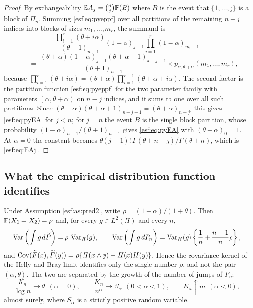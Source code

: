 \begin{proof}
By exchangeability $\mathbb{E} A_j = \binom{n}{j} \mathbb{P}(B)$ where $B$ is the event that
$\{1,\dots,j\}$ is a block of $\Pi_n$. Summing \eqref{esf:eq:pyeppf} over all partitions
of the remaining $n-j$ indices into blocks of sizes $m_1,\dots,m_r$, the summand is
\[
\frac{\prod_{i=1}^{r}(\theta+i\alpha)}{(\theta+1)_{n-1}} (1-\alpha)_{j-1}
\prod_{i=1}^{r} (1-\alpha)_{m_i - 1}
\]
\[
\qquad = \; \frac{(\theta+\alpha) (1-\alpha)_{j-1} (\theta+\alpha+1)_{n-j-1}}
{(\theta+1)_{n-1}} \times p_{\alpha, \theta+\alpha}(m_1,\dots,m_r),
\]
because $\prod_{i=1}^{r}(\theta+i\alpha) = (\theta+\alpha)
\prod_{i=1}^{r-1}(\theta+\alpha+i\alpha)$. The second factor is the partition function
\eqref{esf:eq:pyeppf} for the two parameter family with parameters $(\alpha, \theta+\alpha)$
on $n-j$ indices, and it sums to one over all such partitions. Since $(\theta+\alpha)(\theta+\alpha+1)_{n-j-1} = (\theta+\alpha)_{n-j}$, this gives \eqref{esf:eq:pyEA} for $j < n$; for $j = n$ the event $B$ is the single block partition, whose probability $(1-\alpha)_{n-1}/(\theta+1)_{n-1}$ gives \eqref{esf:eq:pyEA} with $(\theta+\alpha)_0 = 1$. At $\alpha = 0$ the
constant becomes $\theta (j-1)! \, \Gamma(\theta+n-j)/\Gamma(\theta+n)$, which is
\eqref{esf:eq:EAj}.
\end{proof}

\subsection{What the empirical distribution function identifies}

\begin{proposition}
\label{esf:prop:pyident}
Under Assumption \ref{esf:as:pred2}, write $\rho = (1-\alpha)/(1+\theta)$. Then
$\mathbb{P}(X_1 = X_2) = \rho$ and, for every $g \in L^2(H)$ and every $n$,
\begin{equation}
\operatorname{Var} \left( \int g \, d\widetilde{P} \right) = \rho \, \operatorname{Var}_H(g),
\qquad
\operatorname{Var} \left( \int g \, dP_n \right)
= \operatorname{Var}_H(g) \left\{ \frac{1}{n} + \frac{n-1}{n} \rho \right\},
\label{esf:eq:pyvar}
\end{equation}
and $\operatorname{Cov}(\widetilde{F}(x), \widetilde{F}(y)) = \rho \{ H(x \wedge y) - H(x) H(y) \}$. Hence the
covariance kernel of the Helly and Bray limit identifies only the single number
$\rho$, and not the pair $(\alpha, \theta)$. The two are separated by the growth of
the number of jumps of $F_n$:
\[
\frac{K_n}{\log n} \to \theta \ \ (\alpha = 0), \qquad
\frac{K_n}{n^{\alpha}} \to S_\alpha \ \ (0 < \alpha < 1), \qquad
K_n \uparrow m \ \ (\alpha < 0),
\]
almost surely, where $S_\alpha$ is a strictly positive random variable.
\end{proposition}

